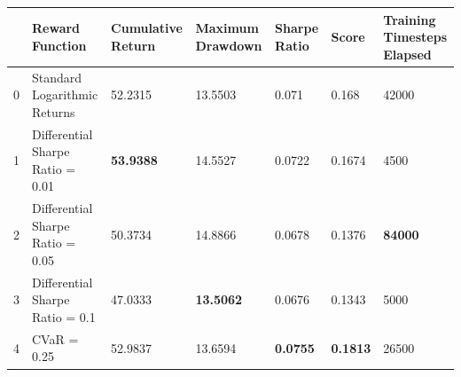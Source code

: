 \begin{tabular}{lllllll}
\toprule
 & Reward Function & Cumulative Return & Maximum Drawdown & Sharpe Ratio & Score & Training Timesteps Elapsed \\
\midrule
0 & Standard Logarithmic Returns & 52.2315 & 13.5503 & 0.071 & 0.168 & 42000 \\
1 & Differential Sharpe Ratio = 0.01 & \textbf{53.9388} & 14.5527 & 0.0722 & 0.1674 & 4500 \\
2 & Differential Sharpe Ratio = 0.05 & 50.3734 & 14.8866 & 0.0678 & 0.1376 & \textbf{84000} \\
3 & Differential Sharpe Ratio = 0.1 & 47.0333 & \textbf{13.5062} & 0.0676 & 0.1343 & 5000 \\
4 & CVaR = 0.25 & 52.9837 & 13.6594 & \textbf{0.0755} & \textbf{0.1813} & 26500 \\
\bottomrule
\end{tabular}
